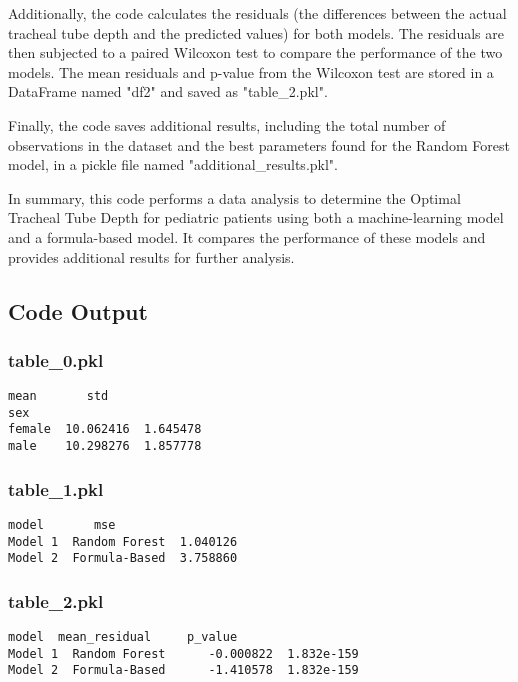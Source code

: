 \documentclass[11pt]{article}
\begin{document}
Additionally, the code calculates the residuals (the differences between the actual tracheal tube depth and the predicted values) for both models. The residuals are then subjected to a paired Wilcoxon test to compare the performance of the two models. The mean residuals and p-value from the Wilcoxon test are stored in a DataFrame named "df2" and saved as "table\_2.pkl".

Finally, the code saves additional results, including the total number of observations in the dataset and the best parameters found for the Random Forest model, in a pickle file named "additional\_results.pkl".

In summary, this code performs a data analysis to determine the Optimal Tracheal Tube Depth for pediatric patients using both a machine-learning model and a formula-based model. It compares the performance of these models and provides additional results for further analysis.

\subsection{Code Output}

\subsubsection*{table\_0.pkl}

\begin{Verbatim}[tabsize=4]
             mean       std
sex
female  10.062416  1.645478
male    10.298276  1.857778
\end{Verbatim}

\subsubsection*{table\_1.pkl}

\begin{Verbatim}[tabsize=4]
                 model       mse
Model 1  Random Forest  1.040126
Model 2  Formula-Based  3.758860
\end{Verbatim}

\subsubsection*{table\_2.pkl}

\begin{Verbatim}[tabsize=4]
                 model  mean_residual     p_value
Model 1  Random Forest      -0.000822  1.832e-159
Model 2  Formula-Based      -1.410578  1.832e-159
\end{Verbatim}
\end{document}
